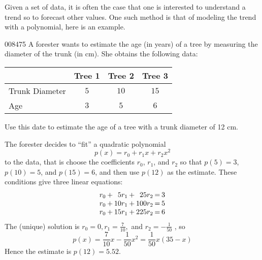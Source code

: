 Given a set of data, it is often the case that one is interested to understand a trend so to forecast other values. One such method is that of modeling the trend with a polynomial, here is an example. 

\begin{example}{}{008475}
A forester wants to estimate the age  (in years) of a tree by measuring the diameter of the trunk (in cm). She
 obtains the following data:
 
\begin{wrapfigure}{l}{5cm}

\end{wrapfigure} 
\begin{center}
\hspace*{0cm}
\begin{tabu} to 15cm {|l|c|c|c|}
\hline
& Tree 1 & Tree 2 & Tree 3 \\ \hline
Trunk Diameter & $5$ & $10$ & $15$ \\
Age & $3$ & $5$ & $6$ \\
\hline
\end{tabu}
\end{center}

Use this date to estimate the age of a tree with a trunk diameter of 12 cm.

\begin{solution}
The forester decides to ``fit'' a quadratic polynomial
\begin{equation*}
p(x) = r_0 + r_1x + r_2x^2
\end{equation*}
to the data, that is choose the coefficients $r_{0}$, $r_{1}$, and $r_{2}$ so that $p(5) = 3$, $p(10) = 5$, and $p(15) = 6$, and then use $p(12)$ as the estimate. These conditions give three linear equations:
\begin{equation*}
\arraycolsep=1pt
\begin{array}{rrrrrrr}
 	 r_0 & + & 5r_1 & + & 25r_2  & = & 3\\
 	 r_0 & + & 10r_1 & + & 100r_2  & = & 5\\
 	 r_0 & + & 15r_1 & + & 225r_2  & = & 6
\end{array}
\end{equation*}
The (unique) solution is $r_0=0, r_1 = \frac{7}{10},$ and $r_2 = -\frac{1}{50}$
, so
\begin{equation*}
p(x) = \frac{7}{10}x - \frac{1}{50}x^2 = \frac{1}{50}x (35-x)
\end{equation*}
Hence the estimate is $p(12) = 5.52$.
\end{solution}
\end{example}


